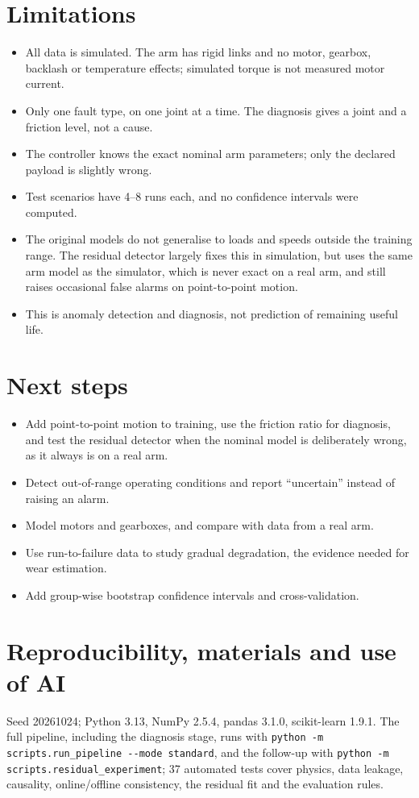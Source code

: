 \documentclass[11pt,a4paper]{article}
\begin{document}
\section{Limitations}
\begin{itemize}
  \item All data is simulated. The arm has rigid links and no motor, gearbox, backlash or temperature effects;
        simulated torque is not measured motor current.
  \item Only one fault type, on one joint at a time. The diagnosis gives a joint and a friction level, not a cause.
  \item The controller knows the exact nominal arm parameters; only the declared payload is slightly wrong.
  \item Test scenarios have 4--8 runs each, and no confidence intervals were computed.
  \item The original models do not generalise to loads and speeds outside the training range. The residual detector
        largely fixes this in simulation, but uses the same arm model as the simulator, which is never exact on a real
        arm, and still raises occasional false alarms on point-to-point motion.
  \item This is anomaly detection and diagnosis, not prediction of remaining useful life.
\end{itemize}

\section{Next steps}
\begin{itemize}
  \item Add point-to-point motion to training, use the friction ratio for diagnosis, and test the residual detector
        when the nominal model is deliberately wrong, as it always is on a real arm.
  \item Detect out-of-range operating conditions and report ``uncertain'' instead of raising an alarm.
  \item Model motors and gearboxes, and compare with data from a real arm.
  \item Use run-to-failure data to study gradual degradation, the evidence needed for wear estimation.
  \item Add group-wise bootstrap confidence intervals and cross-validation.
\end{itemize}

\section{Reproducibility, materials and use of AI}
Seed 20261024; Python 3.13, NumPy 2.5.4, pandas 3.1.0, scikit-learn 1.9.1. The full pipeline, including the diagnosis
stage, runs with \texttt{python -m scripts.run\_pipeline -{}-mode standard}, and the follow-up with
\texttt{python -m scripts.residual\_experiment}; 37 automated tests cover physics, data leakage, causality,
online/offline consistency, the residual fit and the evaluation rules.
\end{document}
